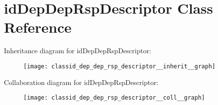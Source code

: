 \hypertarget{classid_dep_dep_rsp_descriptor}{}\section{id\+Dep\+Dep\+Rsp\+Descriptor Class Reference}
\label{classid_dep_dep_rsp_descriptor}


Inheritance diagram for id\+Dep\+Dep\+Rsp\+Descriptor\+:\nopagebreak
\begin{figure}[H]
\begin{center}
\leavevmode
\texttt{[image: classid\_dep\_dep\_rsp\_descriptor\_\_inherit\_\_graph]}
\end{center}
\end{figure}


Collaboration diagram for id\+Dep\+Dep\+Rsp\+Descriptor\+:\nopagebreak
\begin{figure}[H]
\begin{center}
\leavevmode
\texttt{[image: classid\_dep\_dep\_rsp\_descriptor\_\_coll\_\_graph]}
\end{center}
\end{figure}
